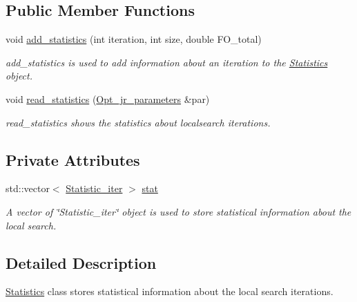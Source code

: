 \subsection*{Public Member Functions}
\begin{DoxyCompactItemize}
\item 
void \hyperlink{classStatistics_addca8205d4c1946fe5af6a1385419c79}{add\-\_\-statistics} (int iteration, int size, double F\-O\-\_\-total)
\begin{DoxyCompactList}\small\item\em add\-\_\-statistics is used to add information about an iteration to the \hyperlink{classStatistics}{Statistics} object. \end{DoxyCompactList}\item 
void \hyperlink{classStatistics_a57df73491ae4c84a8c3b08d912d2ce8e}{read\-\_\-statistics} (\hyperlink{classOpt__jr__parameters}{Opt\-\_\-jr\-\_\-parameters} \&par)
\begin{DoxyCompactList}\small\item\em read\-\_\-statistics shows the statistics about localsearch iterations. \end{DoxyCompactList}\end{DoxyCompactItemize}
\subsection*{Private Attributes}
\begin{DoxyCompactItemize}
\item 
std\-::vector$<$ \hyperlink{classStatistic__iter}{Statistic\-\_\-iter} $>$ \hyperlink{classStatistics_a7b3e8290fbe506b88f7421a2479d258f}{stat}
\begin{DoxyCompactList}\small\item\em A vector of \char`\"{}\-Statistic\-\_\-iter\char`\"{} object is used to store statistical information about the local search. \end{DoxyCompactList}\end{DoxyCompactItemize}


\subsection{Detailed Description}
\hyperlink{classStatistics}{Statistics} class stores statistical information about the local search iterations. 

